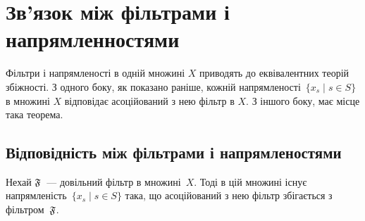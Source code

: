 \chapter{Зв'язок між фільтрами і напрямленностями}

Фільтри і напрямленості в одній множині $X$ приводять до еквівалентних теорій збіжності. З одного боку, як показано раніше, кожній напрямленості~$\{x_s \mid s \in S\}$ в множині $X$ відповідає асоційований з нею фільтр в $X$. З іншого боку, має місце така теорема.

\section{Відповідність між фільтрами і напрямленостями}

\begin{theorem}
    Нехай $\frak F$~--- довільний фільтр в множині~$X$. Тоді в цій множині існує напрямленість~$\{x_s \mid s \in S\}$ така, що асоційований з нею фільтр збігається з фільтром~$\frak F$.
\end{theorem}

